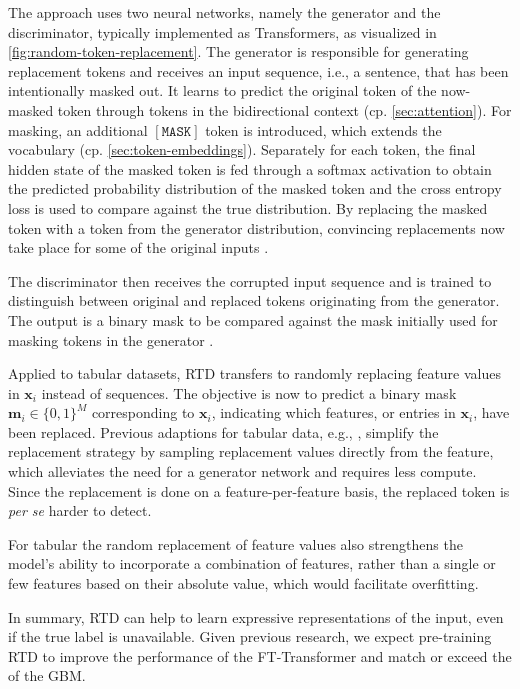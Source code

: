 The approach uses two neural networks, namely the generator and the discriminator, typically implemented as Transformers, as visualized in \cref{fig:random-token-replacement}.  The generator is responsible for generating replacement tokens and receives an input sequence, i.e., a sentence, that has been intentionally masked out. It learns to predict the original token of the now-masked token through tokens in the bidirectional context (cp. \cref{sec:attention}). For masking, an additional $\mathtt{[MASK]}$ token is introduced, which extends the vocabulary (cp. \cref{sec:token-embeddings}). Separately for each token, the final hidden state of the masked token is fed through a softmax activation to obtain the predicted probability distribution of the masked token and the cross entropy loss is used to compare against the true distribution. By replacing the masked token with a token from the generator distribution, convincing replacements now take place for some of the original inputs \autocite[][2--3]{clarkElectraPretrainingText2020}.

The discriminator then receives the corrupted input sequence and is trained to distinguish between original and replaced tokens originating from the generator. The output is a binary mask to be compared against the mask initially used for masking tokens in the generator \autocite[][2--3]{clarkElectraPretrainingText2020}.

Applied to tabular datasets, \gls{RTD} transfers to randomly replacing feature values in $\mathbf{x}_{i}$ instead of sequences. The objective is now to predict a binary mask $\mathbf{m}_{i}\in \{0,1\}^{M}$ corresponding to $\mathbf{x}_{i}$, indicating which features, or entries in $\mathbf{x}_{i}$, have been replaced. Previous adaptions for tabular data, e.g., \textcite[][3]{huangTabTransformerTabularData2020}, simplify the replacement strategy by sampling replacement values directly from the feature, which alleviates the need for a generator network and requires less compute. Since the replacement is done on a feature-per-feature basis, the replaced token is \emph{per se} harder to detect.

For tabular the random replacement of feature values also strengthens the model's ability to incorporate a combination of features, rather than a single or few features based on their absolute value, which would facilitate overfitting.

In summary, \gls{RTD} can help to learn expressive representations of the input, even if the true label is unavailable. Given previous research, we expect pre-training \gls{RTD} to improve the performance of the FT-Transformer and match or exceed the of the \gls{GBM}.

